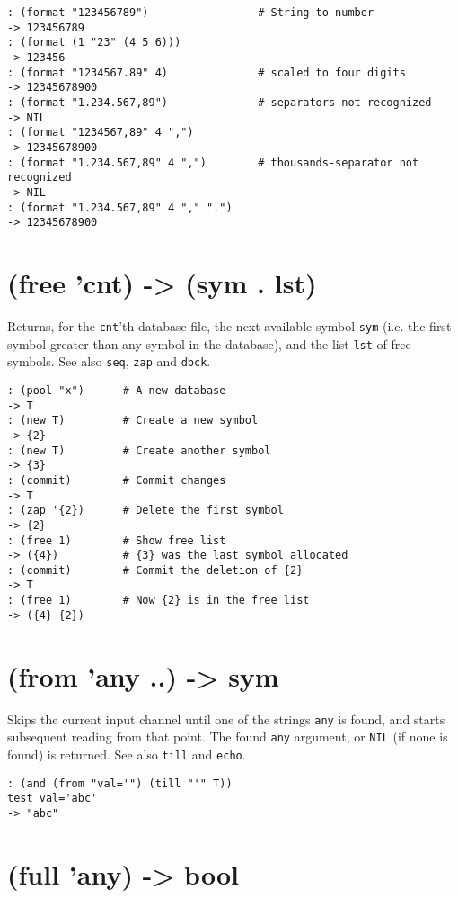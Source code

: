 {{{{{{\begin{verbatim}
: (format "123456789")                 # String to number
-> 123456789
: (format (1 "23" (4 5 6)))
-> 123456
: (format "1234567.89" 4)              # scaled to four digits
-> 12345678900
: (format "1.234.567,89")              # separators not recognized
-> NIL
: (format "1234567,89" 4 ",")
-> 12345678900
: (format "1.234.567,89" 4 ",")        # thousands-separator not recognized
-> NIL
: (format "1.234.567,89" 4 "," ".")
-> 12345678900
\end{verbatim}

 
\section{(free 'cnt) -> (sym . lst)}
\label{sec-8-1-6-24}


Returns, for the \texttt{cnt}'th database file, the next available symbol \texttt{sym}
(i.e. the first symbol greater than any symbol in the database), and the
list \texttt{lst} of free symbols. See also \texttt{seq}, \texttt{zap} and \texttt{dbck}.


\begin{verbatim}
: (pool "x")      # A new database
-> T
: (new T)         # Create a new symbol
-> {2}
: (new T)         # Create another symbol
-> {3}
: (commit)        # Commit changes
-> T
: (zap '{2})      # Delete the first symbol
-> {2}
: (free 1)        # Show free list
-> ({4})          # {3} was the last symbol allocated
: (commit)        # Commit the deletion of {2}
-> T
: (free 1)        # Now {2} is in the free list
-> ({4} {2})
\end{verbatim}

 
\section{(from 'any ..) -> sym}
\label{sec-8-1-6-25}


Skips the current input channel until one of the strings \texttt{any} is found,
and starts subsequent reading from that point. The found \texttt{any} argument,
or \texttt{NIL} (if none is found) is returned. See also \texttt{till} and \texttt{echo}.


\begin{verbatim}
: (and (from "val='") (till "'" T))
test val='abc'
-> "abc"
\end{verbatim}

 
\section{(full 'any) -> bool}
\label{sec-8-1-6-26}


}}}}}}
